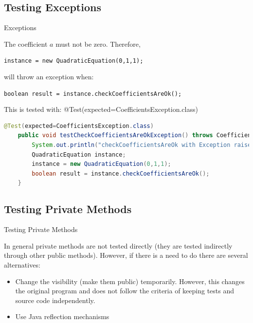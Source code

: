 \documentclass[11pt, xcolor=svgnames]{beamer}
\begin{document}

\subsection{Testing Exceptions}



\begin{frame}[fragile]{Exceptions}

The coefficient $a$ must not be zero. Therefore,

\texttt{instance = new QuadraticEquation(0,1,1);}

will throw an exception when:

\texttt{boolean result = instance.checkCoefficientsAreOk();}

This is tested with:
    @Test(expected=CoefficientsException.class)

\begin{lstlisting}[language=JAVA,basicstyle=\scriptsize]
    @Test(expected=CoefficientsException.class)
    public void testCheckCoefficientsAreOkException() throws CoefficientsException {
        System.out.println("checkCoefficientsAreOk with Exception raised");
        QuadraticEquation instance;
        instance = new QuadraticEquation(0,1,1);
        boolean result = instance.checkCoefficientsAreOk();
    }
\end{lstlisting}

\end{frame}


\subsection{Testing Private Methods}


\begin{frame}{Testing Private Methods}

In general private methods are not tested directly (they are tested indirectly through other public methods). However, if there is a need to do there are several alternatives:

\begin{itemize}
 \item Change the visibility (make them public) temporarily. However, this changes the original program and does not follow the criteria of keeping tests and source code independently.
 \item Use Java reflection mechanisms
\end{itemize}


\end{frame}
\end{document}
